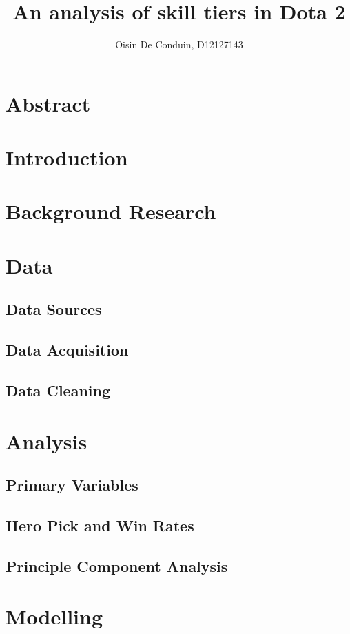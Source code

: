 \documentclass[11pt]{article}
\title{An analysis of skill tiers in Dota 2}
\author{Oisin De Conduin, D12127143}
\begin{document}
\maketitle

\section{Abstract}


\section{Introduction}

\section{Background Research}

\section{Data}
\subsection{Data Sources}
\subsection{Data Acquisition}
\subsection{Data Cleaning}

\section{Analysis}
\subsection{Primary Variables}
\subsection{Hero Pick and Win Rates}
\subsection{Principle Component Analysis}


\section{Modelling}
\end{document}
